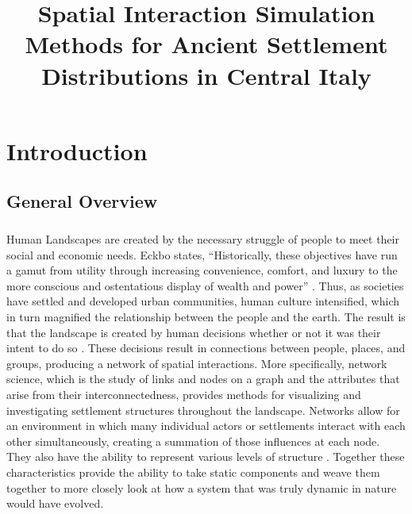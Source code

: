 \documentclass[12pt,a4paper]{thesis}
\begin{document}
\title{Spatial Interaction Simulation Methods for Ancient Settlement Distributions in Central Italy}

\maketitle

\tableofcontents

\listoffigures

\listoftables

\chapter{Introduction}
\section{General Overview}

\paragraph{}
Human Landscapes are created by the necessary struggle of people to meet their social and economic needs.  Eckbo states, ``Historically, these objectives have run a gamut from utility through increasing convenience, comfort, and luxury to the more conscious and ostentatious display of wealth and power'' \citeyearpar[p. 8]{Eckbo69}. Thus, as societies have settled and developed urban communities, human culture intensified, which in turn magnified the relationship between the people and the earth. The result is that the landscape is created by human decisions whether or not it was their intent to do so \citetext{\citealp[3-8]{Eckbo69}; \citealp[161]{AnsWilSch01}}. These decisions result in connections between people, places, and groups, producing a network of spatial interactions. More specifically, network science, which is the study of links and nodes on a graph and the attributes that arise from their interconnectedness, provides methods for visualizing and investigating settlement structures throughout the landscape. Networks allow for an environment in which many individual actors or settlements interact with each other simultaneously, creating a summation of those influences at each node. They also have the ability to represent various levels of structure \cite[9-10]{KnoKuk92}. Together these characteristics provide the ability to take static components and weave them together to more closely look at how a system that was truly dynamic in nature would have evolved.
\end{document}
